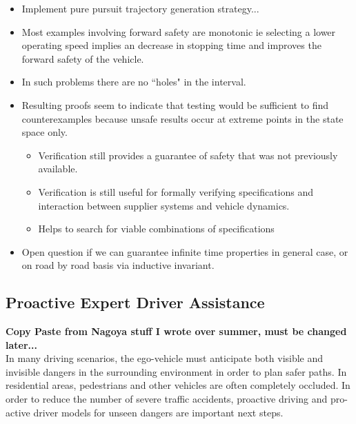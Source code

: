 \documentclass{easychair}
\begin{document}
\begin{itemize}
	\item Implement pure pursuit trajectory generation strategy...
\end{itemize}
\begin{itemize}
	\item Most examples involving forward safety are monotonic ie selecting a lower operating speed implies an decrease in stopping time and improves the forward safety of the vehicle. 
	\item In such problems there are no ``holes" in the interval. 
	\item Resulting proofs seem to indicate that testing would be sufficient to find counterexamples because unsafe results occur at extreme points in the state space only.
		\begin{itemize}
			\item Verification still provides a guarantee of safety that was not previously available. 
			\item Verification is still useful for formally verifying specifications and interaction between supplier systems and vehicle dynamics.
			\item Helps to search for viable combinations of specifications
		\end{itemize}
	\item Open question if we can guarantee infinite time properties in general case, or on road by road basis via inductive invariant. 
\end{itemize}


\subsection{Proactive Expert Driver Assistance}
\textbf{Copy Paste from Nagoya stuff I wrote over summer, must be changed later...}\\
In many driving scenarios, the ego-vehicle must anticipate both visible and invisible dangers in the surrounding environment in order to plan safer paths. In residential areas, pedestrians and other vehicles are often completely occluded. In order to reduce the number of severe traffic accidents, proactive driving and pro-active driver models for unseen dangers are important next steps.
\end{document}
